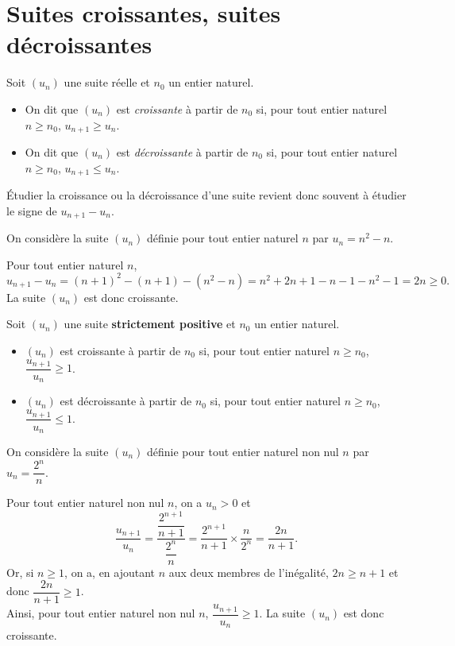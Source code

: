 \documentclass[11pt,fleqn]{book} %
\begin{document}
\section{Suites croissantes, suites décroissantes}

\begin{definition}Soit $(u_n)$ une suite réelle et $n_0$ un entier naturel.

\begin{itemize}
\item On dit que $(u_n)$ est \textit{croissante} à partir de $n_0$ si, pour tout entier naturel $n\geqslant n_0$, $u_{n+1} \geqslant u_n$.
\vskip5pt
\item On dit que $(u_n)$ est \textit{décroissante} à partir de $n_0$ si, pour tout entier naturel $n\geqslant n_0$, $u_{n+1} \leqslant u_n$.
\end{itemize}\end{definition}

Étudier la croissance ou la décroissance d'une suite revient donc souvent à étudier le signe de $u_{n+1}-u_n$.

\begin{example}On considère la suite $(u_n)$ définie pour tout entier naturel $n$ par $u_n=n^2-n$. 

Pour tout entier naturel $n$,
\[u_{n+1}-u_n = (n+1)^2-(n+1)-(n^2-n)=n^2+2n+1-n-1-n^2-1=2n \geqslant 0.\]
La suite $(u_n)$ est donc croissante.\end{example}
\newpage
\begin{proposition}Soit $(u_n)$ une suite \textbf{strictement positive} et $n_0$ un entier naturel. 
\begin{itemize}
\item $(u_n)$ est croissante à partir de $n_0$ si, pour tout entier naturel $n\geqslant n_0$, $\dfrac{u_{n+1}}{u_n} \geqslant 1$.
\vskip5pt
\item $(u_n)$ est décroissante à partir de $n_0$ si, pour tout entier naturel $n\geqslant n_0$, $\dfrac{u_{n+1}}{u_n} \leqslant 1$.
\end{itemize}
\end{proposition}

\begin{example}On considère la suite $(u_n)$ définie pour tout entier naturel non nul $n$ par $u_n=\dfrac{2^n}{n}$. 

Pour tout entier naturel non nul $n$, on a $u_n>0$ et 
\[\dfrac{u_{n+1}}{u_n}=\dfrac{\dfrac{2^{n+1}}{n+1}}{\dfrac{2^n}{n}}=\dfrac{2^{n+1}}{n+1}\times \dfrac{n}{2^n} = \dfrac{2n}{n+1}.\]
Or, si $n\geqslant 1$, on a, en ajoutant $n$ aux deux membres de l'inégalité, $2n \geqslant n+1$ et donc $\dfrac{2n}{n+1}\geqslant 1$. \\ Ainsi, pour tout entier naturel non nul $n$, $\dfrac{u_{n+1}}{u_n}\geqslant 1$. La suite $(u_n)$ est donc croissante.\end{example}
\end{document}
